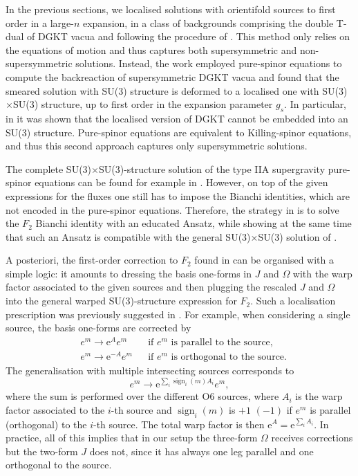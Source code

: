 \documentclass[11pt]{article}
\renewcommand{\[}{\left[}
\renewcommand{\]}{\right]}
\renewcommand{\(}{\left(}
\renewcommand{\)}{\right)}
\newcommand{\e}{\textrm{e}}
\DeclareMathOperator{\sign}{sign}
\newcommand{\<}{\langle}
\renewcommand{\>}{\rangle}
\begin{document}
In the previous sections, we localised solutions with orientifold sources to first order in a large-$n$ expansion, in a class of backgrounds comprising the double T-dual of DGKT vacua and following the procedure of \cite{Junghans:2020acz}. This method only relies on the equations of motion and thus captures both supersymmetric and non-supersymmetric solutions. Instead, the work \cite{Marchesano:2020qvg} employed pure-spinor equations to compute the backreaction of supersymmetric DGKT vacua and found that the smeared solution with SU(3) structure is deformed to a localised one with SU(3)$\times$SU(3) structure, up to first order in the expansion parameter $g_s$. In particular, in \cite{Marchesano:2020qvg} it was shown that the localised version of DGKT cannot be embedded into an SU(3) structure. Pure-spinor equations are equivalent to Killing-spinor equations, and thus this second approach captures only supersymmetric solutions.

The complete SU(3)$\times$SU(3)-structure solution of the type IIA supergravity pure-spinor equations can be found for example in \cite{Saracco:2012wc}. However, on top of the given expressions for the fluxes one still has to impose the Bianchi identities, which are not encoded in the pure-spinor equations. Therefore, the strategy in \cite{Marchesano:2020qvg} is to solve the $F_2$ Bianchi identity with an educated Ansatz, while showing at the same time that such an Ansatz is compatible with the general SU(3)$\times$SU(3) solution of \cite{Saracco:2012wc}. 

A posteriori, the first-order correction to $F_2$ found in \cite{Marchesano:2020qvg} can be organised with a simple logic: it amounts to dressing the basis one-forms in $J$ and $\Omega$ with the warp factor associated to the given sources and then plugging the rescaled $J$ and $\Omega$ into the general warped SU(3)-structure expression for $F_2$. Such a localisation prescription was previously suggested in \cite{Grana:2006kf}. For example, when considering a single source, the basis one-forms are corrected by
\begin{align}
\label{eq:warpdressing1}
    &e^m \to  \e^{A} e^m &  &\text{if $e^m$ is parallel to the source},\\
    \label{eq:warpdressing2}
    &e^m \to \e^{-A} e^m &  &\text{if $e^m$ is orthogonal to the source}.
 \end{align}
The generalisation with multiple intersecting sources corresponds to
\begin{equation}
\label{eq:warp_corrected_oneform}
    e^m \to \e^{\sum_i \sign_i(m) A_i} e^m,
\end{equation}
where the sum is performed over the different O6 sources, where $A_i$ is the warp factor associated to the $i$-th source and $\sign_i (m)$ is $+1$ $(-1)$ if $e^m$ is parallel (orthogonal) to the $i$-th source. The total warp factor is then  $\e^{A} = \e^{\sum_i A_i}$.
In practice, all of this implies that in our setup the three-form $\Omega$ receives corrections but the two-form $J$ does not, since it has always one leg parallel and one orthogonal to the source.
\end{document}
